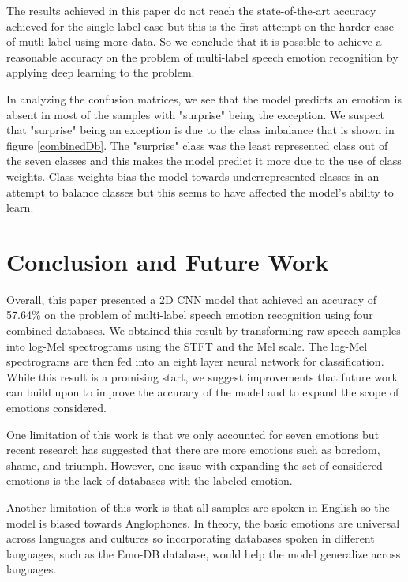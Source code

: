 \documentclass[conference]{IEEEtran}
\begin{document}
The results achieved in this paper do not reach the state-of-the-art accuracy achieved for the single-label case but this is the first attempt on the harder case of mutli-label using more data. So we conclude that it is possible to achieve a reasonable accuracy on the problem of multi-label speech emotion recognition by applying deep learning to the problem. 

In analyzing the confusion matrices, we see that the model predicts an emotion is absent in most of the samples with "surprise" being the exception. We suspect that "surprise" being an exception is due to the class imbalance that is shown in figure \ref{combinedDb}. The "surprise" class was the least represented class out of the seven classes and this makes the model predict it more due to the use of class weights. Class weights bias the model towards underrepresented classes in an attempt to balance classes but this seems to have affected the model's ability to learn.

\section{Conclusion and Future Work}

Overall, this paper presented a 2D CNN model that achieved an accuracy of 57.64\% on the problem of multi-label speech emotion recognition using four combined databases. We obtained this result by transforming raw speech samples into log-Mel spectrograms using the STFT and the Mel scale. The log-Mel spectrograms are then fed into an eight layer neural network for classification. While this result is a promising start, we suggest improvements that future work can build upon to improve the accuracy of the model and to expand the scope of emotions considered.

One limitation of this work is that we only accounted for seven emotions but recent research has suggested that there are more emotions such as boredom, shame, and triumph. \cite{Cordaro2018} However, one issue with expanding the set of considered emotions is the lack of databases with the labeled emotion.

Another limitation of this work is that all samples are spoken in English so the model is biased towards Anglophones. In theory, the basic emotions are universal across languages and cultures so incorporating databases spoken in different languages, such as the Emo-DB database, would help the model generalize across languages.\cite{Burkhardt2005}
\end{document}

